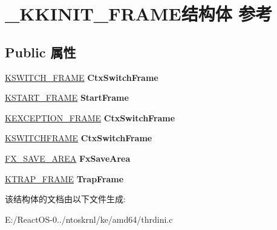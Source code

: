 \hypertarget{struct___k_k_i_n_i_t___f_r_a_m_e}{}\section{\+\_\+\+K\+K\+I\+N\+I\+T\+\_\+\+F\+R\+A\+M\+E结构体 参考}
\label{struct___k_k_i_n_i_t___f_r_a_m_e}
\subsection*{Public 属性}
\begin{DoxyCompactItemize}
\item 
\mbox{\label{struct___k_k_i_n_i_t___f_r_a_m_e_a173745e48611c7ce3ec82eaf5290269d}} 
\hyperlink{struct___k_s_w_i_t_c_h___f_r_a_m_e}{K\+S\+W\+I\+T\+C\+H\+\_\+\+F\+R\+A\+ME} {\bfseries Ctx\+Switch\+Frame}
\item 
\mbox{\label{struct___k_k_i_n_i_t___f_r_a_m_e_a8a1d1a56f2f41a8d3a136dc58e66f4ff}} 
\hyperlink{struct___k_s_t_a_r_t___f_r_a_m_e}{K\+S\+T\+A\+R\+T\+\_\+\+F\+R\+A\+ME} {\bfseries Start\+Frame}
\item 
\mbox{\label{struct___k_k_i_n_i_t___f_r_a_m_e_a8e5da81f5699cce3fad8c5686e3b2736}} 
\hyperlink{struct___k_e_x_c_e_p_t_i_o_n___f_r_a_m_e}{K\+E\+X\+C\+E\+P\+T\+I\+O\+N\+\_\+\+F\+R\+A\+ME} {\bfseries Ctx\+Switch\+Frame}
\item 
\mbox{\label{struct___k_k_i_n_i_t___f_r_a_m_e_a173745e48611c7ce3ec82eaf5290269d}} 
\hyperlink{struct___k_s_w_i_t_c_h_f_r_a_m_e}{K\+S\+W\+I\+T\+C\+H\+F\+R\+A\+ME} {\bfseries Ctx\+Switch\+Frame}
\item 
\mbox{\label{struct___k_k_i_n_i_t___f_r_a_m_e_a3a5c2e5d460bd8a88767ed69bc83cfa2}} 
\hyperlink{struct___f_x___s_a_v_e___a_r_e_a}{F\+X\+\_\+\+S\+A\+V\+E\+\_\+\+A\+R\+EA} {\bfseries Fx\+Save\+Area}
\item 
\mbox{\label{struct___k_k_i_n_i_t___f_r_a_m_e_a9aaeaec68b4dc4c6829f10bbd1b967d6}} 
\hyperlink{struct___k_t_r_a_p___f_r_a_m_e}{K\+T\+R\+A\+P\+\_\+\+F\+R\+A\+ME} {\bfseries Trap\+Frame}
\end{DoxyCompactItemize}


该结构体的文档由以下文件生成\+:\begin{DoxyCompactItemize}
\item 
E\+:/\+React\+O\+S-\/0../ntoskrnl/ke/amd64/thrdini.\+c\end{DoxyCompactItemize}
